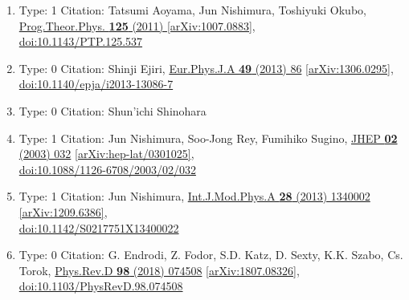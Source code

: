\documentclass[a4paper,10pt]{article}
\begin{document}
\begin{enumerate}
\begin{enumerate}
  \item Type: 1 Citation: Tatsumi Aoyama, Jun Nishimura, Toshiyuki Okubo, \href{https://www.doi.org/10.1143/PTP.125.537}{Prog.Theor.Phys. {\bf 125} (2011) }  \href{https://arxiv.org/abs/1007.0883}{[arXiv:1007.0883]},\\\href{https://www.doi.org/10.1143/PTP.125.537}{doi:10.1143/PTP.125.537}
  \item Type: 0 Citation: Shinji Ejiri, \href{https://www.doi.org/10.1140/epja/i2013-13086-7}{Eur.Phys.J.A {\bf 49} (2013) 86}  \href{https://arxiv.org/abs/1306.0295}{[arXiv:1306.0295]},\\\href{https://www.doi.org/10.1140/epja/i2013-13086-7}{doi:10.1140/epja/i2013-13086-7}
  \item Type: 0 Citation: Shun'ichi Shinohara
  \item Type: 1 Citation: Jun Nishimura, Soo-Jong Rey, Fumihiko Sugino, \href{https://www.doi.org/10.1088/1126-6708/2003/02/032}{JHEP {\bf 02} (2003) 032}  \href{https://arxiv.org/abs/hep-lat/0301025}{[arXiv:hep-lat/0301025]},\\\href{https://www.doi.org/10.1088/1126-6708/2003/02/032}{doi:10.1088/1126-6708/2003/02/032}
  \item Type: 1 Citation: Jun Nishimura, \href{https://www.doi.org/10.1142/S0217751X13400022}{Int.J.Mod.Phys.A {\bf 28} (2013) 1340002}  \href{https://arxiv.org/abs/1209.6386}{[arXiv:1209.6386]},\\\href{https://www.doi.org/10.1142/S0217751X13400022}{doi:10.1142/S0217751X13400022}
  \item Type: 0 Citation: G. Endrodi, Z. Fodor, S.D. Katz, D. Sexty, K.K. Szabo, Cs. Torok, \href{https://www.doi.org/10.1103/PhysRevD.98.074508}{Phys.Rev.D {\bf 98} (2018) 074508}  \href{https://arxiv.org/abs/1807.08326}{[arXiv:1807.08326]},\\\href{https://www.doi.org/10.1103/PhysRevD.98.074508}{doi:10.1103/PhysRevD.98.074508}

\end{enumerate}
\end{enumerate}
\end{document}
